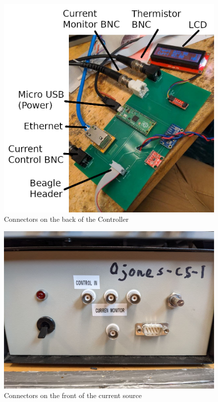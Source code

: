 \documentclass[11pt, letterpaper]{article}
\begin{document}
\begin{figure}[H]
    \centering
    \includegraphics[width=15cm]{controllerConnections.jpg}
    \caption{ Connectors on the back of the Controller }
    \label{fig:controllerConnections}
\end{figure}

\begin{figure}[H]
    \centering
    \includegraphics[width=15cm]{currentSourceConnections.jpg}
    \caption{ Connectors on the front of the current source }
    \label{fig:currentSourceConnections}
\end{figure}
\end{document}
